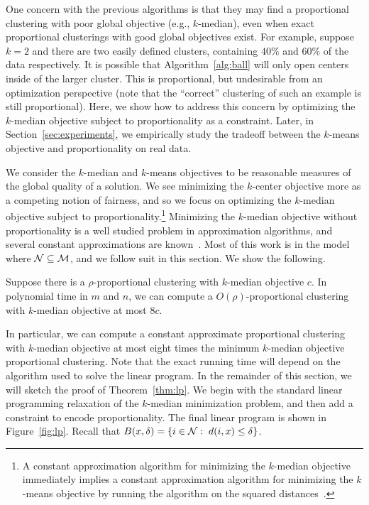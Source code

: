 One concern with the previous algorithms is that they may find a  proportional clustering with poor global objective (e.g., $k$-median), even when exact proportional clusterings with good global objectives exist. For example, suppose $k=2$ and there are two easily defined clusters, containing $40\%$ and $60\%$ of the data respectively. It is possible that Algorithm~\ref{alg:ball} will only open centers inside of the larger cluster. This is proportional, but undesirable from an optimization perspective (note that the ``correct'' clustering of such an example is still proportional). Here, we show how to address this concern by optimizing the $k$-median objective subject to proportionality as a constraint. Later, in Section~\ref{sec:experiments}, we empirically study the tradeoff between the $k$-means objective and proportionality on real data.

We consider the $k$-median and $k$-means objectives to be reasonable measures of the global quality of a solution. We see minimizing the $k$-center objective more as a competing notion of fairness, and so we focus on optimizing the $k$-median objective subject to proportionality.\footnote{A constant approximation algorithm for minimizing the $k$-median objective immediately implies a constant approximation algorithm for minimizing the $k$-means objective by running the algorithm on the squared distances~\cite{mettuPlaxton}.} %
Minimizing the $k$-median objective without proportionality is a well studied problem in approximation algorithms, and several constant approximations are known~\cite{kMedianLP, kmedians, mettuPlaxton}. %
Most of this work is in the model where $\mathcal {N} \subseteq \mathcal{M}$, and we follow suit in this section. %
We show the following.

\begin{theorem}
\label{thm:lp}
Suppose there is a $\rho$-proportional clustering with $k$-median objective $c$. In polynomial time in $m$ and $n$, we can compute a $O(\rho)$-proportional clustering with $k$-median objective at most $8 c$.
\end{theorem}

In particular, we can compute a constant approximate proportional clustering with $k$-median objective at most eight times the minimum $k$-median objective proportional clustering. Note that the exact running time will depend on the algorithm used to solve the linear program. In the remainder of this section, we will sketch the proof of Theorem~\ref{thm:lp}. We begin with the standard linear programming relaxation of the $k$-median minimization problem, and then add a constraint to encode proportionality. The final linear program is shown in Figure~\ref{fig:lp}. Recall that $B(x, \delta) = \{i \in \mathcal {N}: \; d(i, x) \leq \delta\}$.

